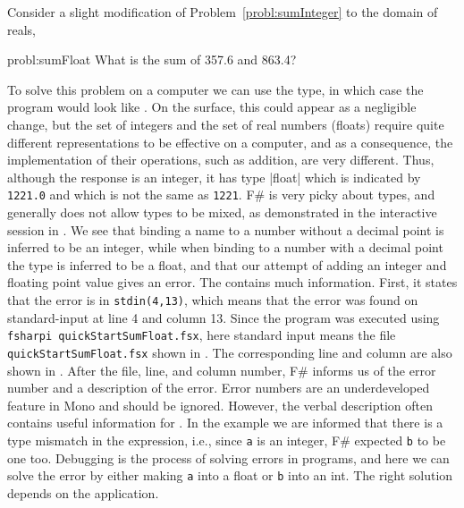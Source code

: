 \documentclass[fsharpNotes.tex]{subfiles}
\begin{document}
Consider a slight modification of Problem~\ref{probl:sumInteger} to the domain of reals,
%
\begin{task}{probl:sumFloat}
  What is the sum of 357.6 and 863.4?
\end{task}
%
To solve this problem on a computer we can use the  type, in which case the program would look like .
%
%
On the surface, this could appear as a negligible change, but the set of integers and the set of real numbers (floats) require quite different representations to be effective on a computer, and as a consequence, the implementation of their operations, such as addition, are very different. Thus, although the response is an integer, it has type \keyword|float| which is indicated by \lstinline|1221.0| and which is not the same as \lstinline|1221|. F\# is very picky about types, and generally does not allow types to be mixed, as demonstrated in the interactive session in .
%
%
We see that binding a name to a number without a decimal point is inferred to be an integer, while when binding to a number with a decimal point the type is inferred to be a float, and that our attempt of adding an integer and floating point value gives an error. The  contains much information. First, it states that the error is in \lstinline[language=console]{stdin(4,13)}, which means that the error was found on standard-input at line 4 and column 13. Since the program was executed using \lstinline[language=console]{fsharpi quickStartSumFloat.fsx}, here standard input means the file \lstinline[language=console]{quickStartSumFloat.fsx} shown in . The corresponding line and column are also shown in . After the file, line, and column number, F\# informs us of the error number and a description of the error. Error numbers are an underdeveloped feature in Mono and should be ignored. However, the verbal description often contains useful information for . In the example we are informed that there is a type mismatch in the expression, i.e., since \lstinline{a} is an integer, F\# expected \lstinline{b} to be one too. Debugging is the process of solving errors in programs, and here we can solve the error by either making \lstinline{a} into a float or \lstinline{b} into an int. The right solution depends on the application.
\end{document}
